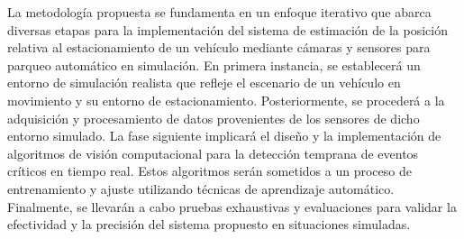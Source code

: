 \noindent
La metodología propuesta se fundamenta en un enfoque iterativo que abarca diversas etapas para la implementación del sistema
de estimación de la posición relativa al estacionamiento de un vehículo mediante cámaras y sensores para parqueo automático en simulación.
En primera instancia, se establecerá un entorno de simulación realista que refleje el escenario de un vehículo en movimiento y su entorno de estacionamiento.
Posteriormente, se procederá a la adquisición y procesamiento de datos provenientes de los sensores de dicho entorno simulado.
La fase siguiente implicará el diseño y la implementación de algoritmos de visión computacional para la detección temprana de eventos críticos en tiempo real.
Estos algoritmos serán sometidos a un proceso de entrenamiento y ajuste utilizando técnicas de aprendizaje automático.
Finalmente, se llevarán a cabo pruebas exhaustivas y evaluaciones para validar la efectividad y la precisión del sistema propuesto en situaciones simuladas.